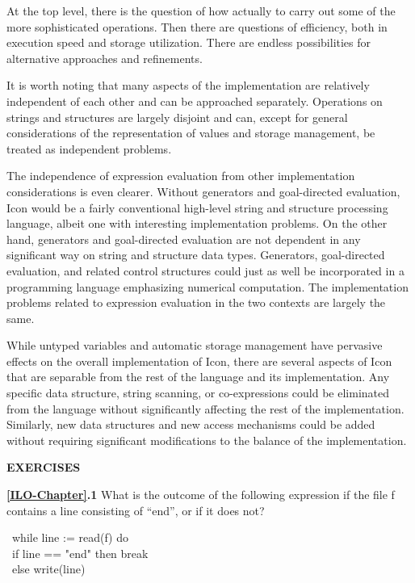 At the top level, there is the question of how actually to carry out
some of the more sophisticated operations. Then there are questions of
efficiency, both in execution speed and storage utilization. There are
endless possibilities for alternative approaches and refinements.

It is worth noting that many aspects of the implementation are
relatively independent of each other and can be approached
separately. Operations on strings and structures are largely disjoint
and can, except for general considerations of the representation of
values and storage management, be treated as independent problems.

The independence of expression evaluation from other implementation
considerations is even clearer. Without generators and goal-directed
evaluation, Icon would be a fairly conventional high-level string and
structure processing language, albeit one with interesting
implementation problems. On the other hand, generators and
goal-directed evaluation are not dependent in any significant way on
string and structure data types. Generators, goal-directed evaluation,
and related control structures could just as well be incorporated in a
programming language emphasizing numerical computation. The
implementation problems related to expression evaluation in the two
contexts are largely the same.

While untyped variables and automatic storage management have
pervasive effects on the overall implementation of Icon, there are
several aspects of Icon that are separable from the rest of the
language and its implementation. Any specific data structure, string
scanning, or co-expressions could be eliminated from the language
without significantly affecting the rest of the
implementation. Similarly, new data structures and new access
mechanisms could be added without requiring significant modifications
to the balance of the implementation.

\bigskip

\noindent \textbf{EXERCISES}

\noindent \textbf{\ref*{ILO-Chapter}.1}
What is the outcome of the following expression if the
file f contains a line consisting of ``end'', or if it does not?

\begin{iconcode}
\>\ while line := read(f) do\\
\>\>\>\ if line == "end" then break\\
\>\>\>\ else write(line)
\end{iconcode}


